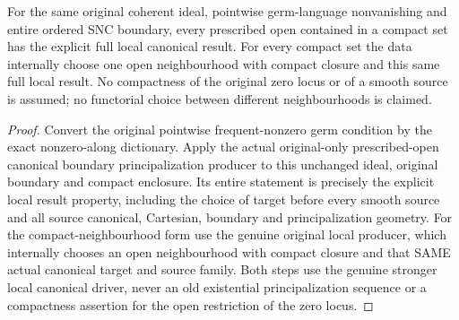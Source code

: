 \begin{theorem}
\label{hir:original-principalization-germ-local-canonical-specializations}
For the same original coherent ideal, pointwise germ-language
nonvanishing and entire ordered SNC boundary, every prescribed open
contained in a compact set has the explicit full local canonical
result. For every compact set the data internally choose one open
neighbourhood with compact closure and this same full local result.
No compactness of the original zero locus or of a smooth source is
assumed; no functorial choice between different neighbourhoods is claimed.
\leanok
\end{theorem}
\begin{proof}
Convert the original pointwise frequent-nonzero germ condition by the
exact nonzero-along dictionary. Apply the actual original-only
prescribed-open canonical boundary principalization producer to this
unchanged ideal, original boundary and compact enclosure. Its entire
statement is precisely the explicit local result property, including
the choice of target before every smooth source and all source
canonical, Cartesian, boundary and principalization geometry. For the
compact-neighbourhood form use the genuine original local producer,
which internally chooses an open neighbourhood with compact closure
and that SAME actual canonical target and source family. Both steps
use the genuine stronger local canonical driver, never an old
existential principalization sequence or a compactness assertion for
the open restriction of the zero locus.
\end{proof}
